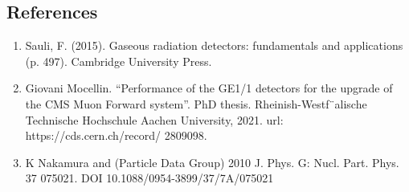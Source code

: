 \documentclass{article}
\begin{document}


\subsection*{References}
\begin{enumerate}
    \item Sauli, F. (2015). Gaseous radiation detectors: fundamentals and applications (p. 497). Cambridge University Press.
    \item Giovani Mocellin. “Performance of the GE1/1 detectors for the upgrade of the
    CMS Muon Forward system”. PhD thesis. Rheinish-Westf¨alische Technische
    Hochschule Aachen University, 2021. url: https://cds.cern.ch/record/
    2809098.
    \item K Nakamura and (Particle Data Group) 2010 J. Phys. G: Nucl. Part. Phys. 37 075021. DOI 10.1088/0954-3899/37/7A/075021
\end{enumerate}




\end{document}
